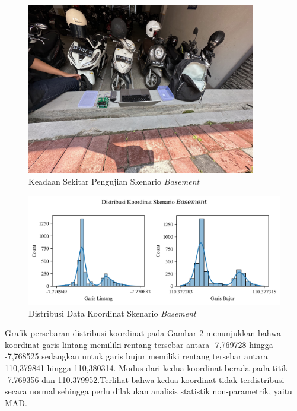 \begin{figure}[H]
	\centering
	\includegraphics[width=10cm]{contents/chapter-4/1-skenario-basement/keadaan.jpg}
	\caption{Keadaan Sekitar Pengujian Skenario \textit{Basement}}
	\label{Fig: basement-keadaan}
\end{figure}

\begin{figure}[H]
	\centering
	\begin{adjustbox}{width=\textwidth}
		\includegraphics{contents/chapter-4/1-skenario-basement/distribution.png}
	\end{adjustbox}
	\caption{Distribusi Data Koordinat Skenario \textit{Basement}}
	\label{Fig:basement-distribution}
\end{figure}

Grafik persebaran distribusi koordinat pada Gambar \ref{Fig:basement-distribution} menunjukkan bahwa koordinat garis lintang memiliki rentang tersebar antara -7,769728 hingga -7,768525 sedangkan untuk garis bujur memiliki rentang tersebar antara 110,379841 hingga 110,380314. Modus dari kedua koordinat berada pada titik -7.769356 dan 110.379952.Terlihat bahwa kedua koordinat tidak terdistribusi secara normal sehingga perlu dilakukan analisis statistik non-parametrik, yaitu MAD.

